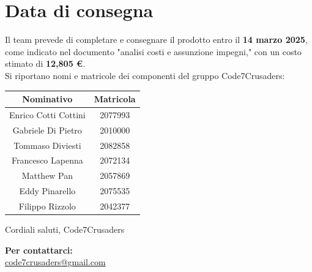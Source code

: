 \documentclass{article}
\begin{document}
\section{Data di consegna}
Il team prevede di completare e consegnare il prodotto entro il \textbf{14 marzo 2025},
come indicato nel documento "analisi costi e assunzione impegni," con un costo stimato di \textbf{12,805 \euro}.
\\
Si riportano nomi e matricole dei componenti del gruppo Code7Crusaders:
\\
\newline
\begin{center}
    \begin{tabular}{|c|c|}
        \hline
        \textbf{Nominativo} & \textbf{Matricola} \\
        \hline
         Enrico Cotti Cottini & 2077993\\
         Gabriele Di Pietro & 2010000\\
         Tommaso Diviesti & 2082858\\
         Francesco Lapenna & 2072134\\
         Matthew Pan & 2057869\\
         Eddy Pinarello & 2075535\\
         Filippo Rizzolo & 2042377\\
         \hline
    \end{tabular}
\end{center}
Cordiali saluti, Code7Crusaders

\begin{center}
    \textbf{Per contattarci:}\\
    \href{mailto:code7crusaders@gmail.com}{code7crusaders@gmail.com}
\end{center}
\end{document}
